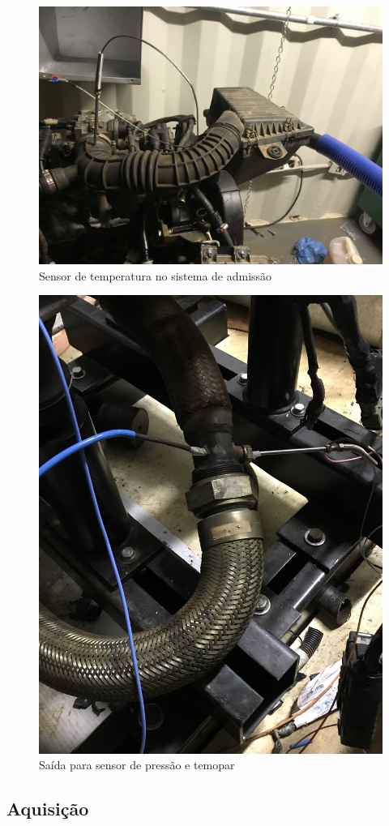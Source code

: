 \begin{figure}[h!]
	\centering
	\includegraphics[keepaspectratio=true,scale= 0.09]{figuras/SensorDeTemperaturaNoSistemaDeAdmissao.JPG}
	\caption{Sensor de temperatura no sistema de admissão}
	\label{sensorDoSistemaAdmissao}
\end{figure}

\begin{figure}[h!]
	\centering
	\includegraphics[angle=270,keepaspectratio=true,scale= 0.09]{figuras/SaidaParaSensorDePressaoETermopar.JPG}
	\caption{Saída para sensor de pressão e temopar}
	\label{saidaParaSensorDePressao}
\end{figure}

\subsection{Aquisição}